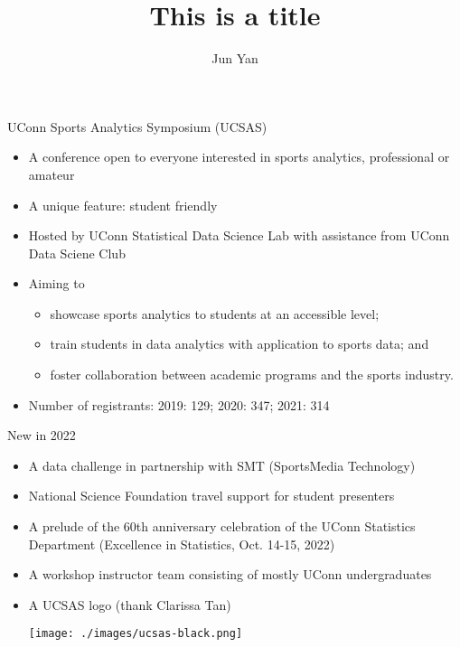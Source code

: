 \documentclass[aspectratio=169, 12pt]{beamer}
\title{This is a title}
\author{Jun Yan}
\begin{document}
 
\frame{\titlepage}

 
\begin{frame}{UConn Sports Analytics Symposium (UCSAS)}
  \begin{itemize}
  \item A conference open to everyone interested in sports analytics, professional or
    amateur
  \item A unique feature: student friendly
  \item Hosted by UConn Statistical Data Science Lab with assistance from UConn
    Data Sciene Club
  \item Aiming to
    \begin{itemize}
    \item showcase sports analytics to students at an accessible
      level;
    \item train students in data analytics with application to
      sports data; and
    \item foster collaboration between academic programs and the
      sports industry.
    \end{itemize}
  \item Number of registrants: 2019: 129; 2020: 347; 2021: 314
  \end{itemize}
\end{frame}


\begin{frame}{New in 2022}
  \begin{itemize}
  \item A data challenge in partnership with SMT (SportsMedia Technology)
  \item National Science Foundation travel support for student presenters
  \item A prelude of the 60th anniversary celebration of the UConn Statistics
    Department (Excellence in Statistics, Oct. 14-15, 2022)
  \item A workshop instructor team consisting of mostly UConn undergraduates
  \item A UCSAS logo (thank Clarissa Tan)
    
    \texttt{[image: ./images/ucsas-black.png]}
  \end{itemize}
\end{frame}
\end{document}
